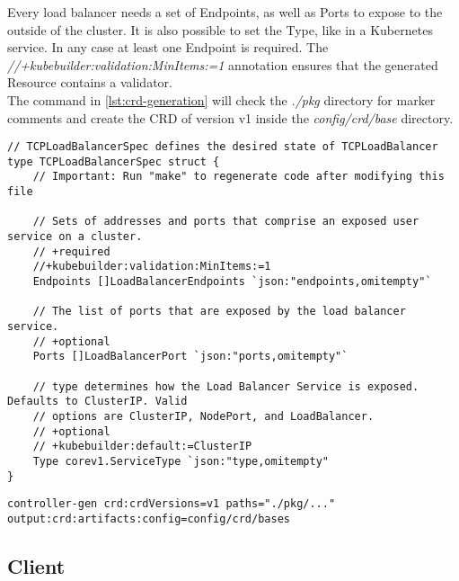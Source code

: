 Every load balancer needs a set of Endpoints, as well as Ports to expose to the outside of the cluster.
It is also possible to set the Type, like in a Kubernetes service.
In any case at least one Endpoint is required.
The \textit{//+kubebuilder:validation:MinItems:=1} annotation ensures that the generated Resource contains a validator.
\\
The command in \autoref{lst:crd-generation} will check the \textit{./pkg} directory for marker comments and create the CRD of version v1 inside the \textit{config/crd/base} directory.
\\
\begin{lstlisting}[caption={TCPLoadBalancerSpec struct}, label={lst:tcpbl-spec}]
// TCPLoadBalancerSpec defines the desired state of TCPLoadBalancer
type TCPLoadBalancerSpec struct {
	// Important: Run "make" to regenerate code after modifying this file

	// Sets of addresses and ports that comprise an exposed user service on a cluster.
	// +required
	//+kubebuilder:validation:MinItems:=1
	Endpoints []LoadBalancerEndpoints `json:"endpoints,omitempty"`

	// The list of ports that are exposed by the load balancer service.
	// +optional
	Ports []LoadBalancerPort `json:"ports,omitempty"`

	// type determines how the Load Balancer Service is exposed. Defaults to ClusterIP. Valid
	// options are ClusterIP, NodePort, and LoadBalancer.
	// +optional
	// +kubebuilder:default:=ClusterIP
	Type corev1.ServiceType `json:"type,omitempty"
}
\end{lstlisting}

\begin{lstlisting}[numbers=none, caption={Generate CRD YAML files with controller-gen}, label={lst:crd-generation}]
	controller-gen crd:crdVersions=v1 paths="./pkg/..." output:crd:artifacts:config=config/crd/bases
\end{lstlisting}

\subsection{Client}\label{subsec:client}

